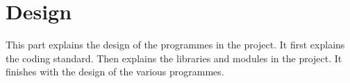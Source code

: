 \part{Design}
\label{part:design}

This part explains the design of the programmes in the project. It first
explains the coding standard. Then explains the libraries and modules in the
project. It finishes with the design of the various programmes.
